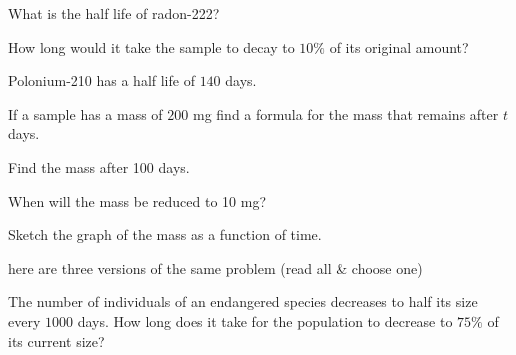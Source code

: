 \begin{multicols}{2}
\subprob What is the half life of radon-222?

\subprob How long would it take the sample to decay to $10\%$ of its
original amount?

\problem   Polonium-210 has a half life of $140$ days.

\subprob If a sample has a mass of $200$ mg find a formula for the
mass that remains after $t$ days.

\subprob Find the mass after 100 days.

\subprob When will the mass be reduced to 10 mg?

\subprob Sketch the graph of the mass as a function of time.










\problem here are three versions of the same problem (read all \& choose one)

\subprob The number of individuals of an endangered species decreases to half
its size every $1000$ days.  How long does it take for the population to
decrease to $75\%$ of its current size?


\end{multicols}
